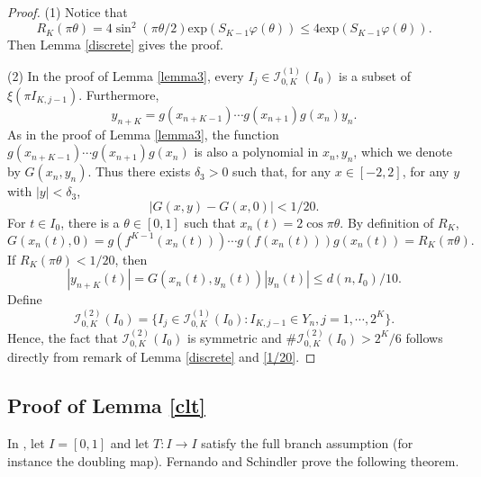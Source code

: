 \documentclass{amsart}
\theoremstyle{definition}
\begin{document}
\begin{proof}
(1) Notice that 
\begin{equation*}
R_K(\pi\theta)=4\sin^2{(\pi\theta/2)}\mathrm{exp}(S_{K-1}\varphi(\theta))\le 4\mathrm{exp}(S_{K-1}\varphi(\theta)).
\end{equation*}
Then Lemma \ref{discrete} gives the proof.


(2) In the proof of Lemma \ref{lemma3},  
every $I_j\in \mathcal{I}_{0,K}^{(1)}(I_0)$ is a subset of $\xi(\pi I_{K,j-1})$.
     Furthermore, 
\begin{equation*}
    y_{n+K}= g(x_{n+K-1})\cdots g(x_{n+1})g(x_n)y_n.
    \end{equation*}
As in the proof of Lemma \ref{lemma3}, the function $g(x_{n+K-1})\cdots g(x_{n+1})g(x_n)$ is also
a polynomial in $x_n, y_n$, which we denote by $G(x_n,y_n)$. 
Thus there exists $\delta_3>0$ such that, for any $x\in [-2,2]$, 
for any $y$ with $|y|<\delta_{3}$, 
\begin{equation*}
|G(x,y)-G(x,0)|<1/20.
\end{equation*}
For $t\in I_0$, there is a $\theta\in[0,1]$ such that $x_n(t)=2\cos\pi\theta$.  By definition of $R_K$,
\begin{equation*}
G(x_n(t),0)=g(f^{K-1}(x_n(t)))\cdots g(f(x_n(t)))g(x_n(t))=R_{K}(\pi\theta).
\end{equation*}
If $R_K(\pi\theta)<1/20$, then
\begin{equation*}
|y_{n+K}(t)|=G(x_n(t),y_n(t))|y_n(t)|\le d(n,I_0)/10.
\end{equation*}
Define 
$$\mathcal{I}_{0,K}^{(2)}(I_0)=\{I_j\in\mathcal{I}_{0,K}^{(1)}(I_0) : 
I_{K,j-1}\in Y_n, j=1,\cdots, 2^K\}.$$
Hence, the fact that $\mathcal{I}_{0,K}^{(2)}(I_0)$ is symmetric and $\#\mathcal{I}_{0,K}^{(2)}(I_0)>2^K/6$ follows directly from remark of Lemma \ref{discrete} and  \eqref{1/20}.
\end{proof}



\subsection{Proof of Lemma \ref{clt}}
In \cite{FS26}, let $I=[0,1]$ and let $T: I\to I$ satisfy the full branch assumption 
(for instance the doubling map). 
Fernando and Schindler prove the following theorem.
\end{document}
